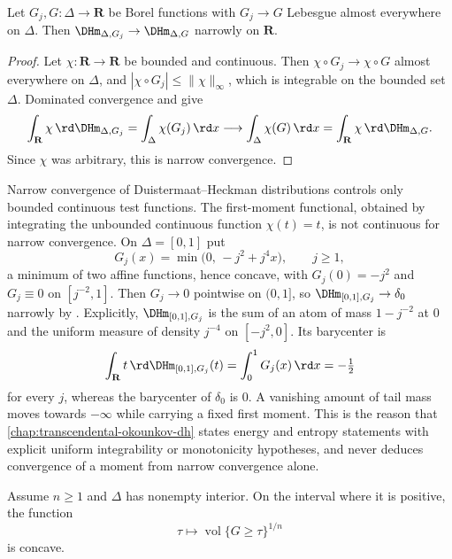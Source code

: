 \begin{corollary}
\label{cor:dh-continuity-ae}
Let $G_j,G:\Delta\to\mathbf R$ be Borel functions with $G_j\to G$ Lebesgue
almost everywhere on $\Delta$.  Then
$\DHm_{\Delta,G_j}\to\DHm_{\Delta,G}$ narrowly on $\mathbf R$.
\end{corollary}

\begin{proof}
Let $\chi:\mathbf R\to\mathbf R$ be bounded and continuous.  Then
$\chi\circ G_j\to\chi\circ G$ almost everywhere on $\Delta$, and
$|\chi\circ G_j|\leq\lVert\chi\rVert_\infty$, which is integrable on the
bounded set $\Delta$.  Dominated convergence and  give
\[
 \int_{\mathbf R}\chi\,\rd\DHm_{\Delta,G_j}
 =\int_\Delta\chi(G_j)\,\rd x
 \longrightarrow\int_\Delta\chi(G)\,\rd x
 =\int_{\mathbf R}\chi\,\rd\DHm_{\Delta,G}.
\]
Since $\chi$ was arbitrary, this is narrow convergence.
\end{proof}

\begin{remark}
\label{rem:dh-moments-not-continuous}
Narrow convergence of Duistermaat--Heckman distributions controls only bounded
continuous test functions.  The first-moment functional, obtained by
integrating the unbounded continuous function $\chi(t)=t$, is not continuous
for narrow convergence.  On
$\Delta=[0,1]$ put
\[
 G_j(x)=\min\bigl(0,\,-j^2+j^4x\bigr),\qquad j\geq1 ,
\]
a minimum of two affine functions, hence concave, with $G_j(0)=-j^2$ and
$G_j\equiv0$ on $[j^{-2},1]$.  Then $G_j\to0$ pointwise on $(0,1]$, so
$\DHm_{[0,1],G_j}\to\delta_0$ narrowly by .
Explicitly, $\DHm_{[0,1],G_j}$ is the sum of an atom of mass $1-j^{-2}$ at
$0$ and the uniform measure of density $j^{-4}$ on $[-j^2,0]$.  Its barycenter
is
\[
 \int_{\mathbf R}t\,\rd\DHm_{[0,1],G_j}(t)
 =\int_0^1G_j(x)\,\rd x=-\tfrac12
\]
for every $j$, whereas the barycenter of $\delta_0$ is $0$.  A vanishing
amount of tail mass moves towards $-\infty$ while carrying a fixed first
moment.  This is the reason that
\cref{chap:transcendental-okounkov-dh} states energy and entropy statements
with explicit uniform integrability or monotonicity hypotheses, and never
deduces convergence of a moment from narrow convergence alone.
\end{remark}

\begin{proposition}\label{prop:dh-brunn-minkowski}
Assume $n\geq1$ and $\Delta$ has nonempty interior.  On the interval where
it is positive,
the function
\[
               \tau\longmapsto
               \operatorname{vol}\{G\geq\tau\}^{1/n}
\]
is concave.
\end{proposition}

